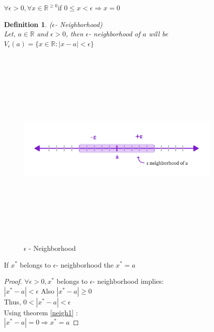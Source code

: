 \documentclass{article}
\newtheorem{definition}{Definition}[section]
\newcommand{\Rw}{\Rightarrow}
\begin{document}
\begin{theorem}{}{}
\label{neigh1}$\forall \epsilon > 0, \forall x \in \mathbb{R}^{\geq 0}$\quad if \quad $0\leq x<\epsilon \Rw x=0$
\end{theorem}
\begin{definition}
    ($\epsilon$- Neighborhood)\\
    Let, $a\in\mathbb{R}$ and $\epsilon > 0$, then $\epsilon$- neighborhood of $a$ will be $V_\epsilon (a)=\{x\in \mathbb{R}: |x-a|<\epsilon\}$    
\end{definition}
\begin{figure}[H]
    \centering
    \includegraphics [width=10cm,height=10cm,keepaspectratio]{tex graphs-10.png}
    \caption{$\epsilon$ - Neighborhood}
\end{figure}
\begin{theorem}{}{}
    If $x^*$ belongs to $\epsilon$- neighborhood the $x^* = a $
    \begin{proof}
        $\forall \epsilon > 0, x^*$ belongs to $\epsilon$- neighborhood implies:\\
        $|x^* -a|< \epsilon$ Also $|x^* -a|\geq 0$\\
        Thus, $0<|x^* -a|< \epsilon$\\
        Using theorem \ref{neigh1} :\\
        $|x^* -a|=0 \Rw x^*=a$
    \end{proof}
\end{theorem}
\end{document}
